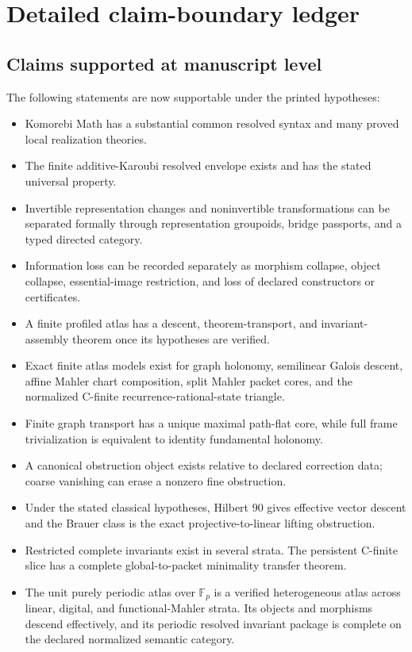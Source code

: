 \section{Detailed claim-boundary ledger}
\label{app:block14-claim-ledger}

\subsection{Claims supported at manuscript level}

The following statements are now supportable under the printed hypotheses:

\begin{itemize}
\item Komorebi Math has a substantial common resolved syntax and many proved local realization theories.
\item The finite additive-Karoubi resolved envelope exists and has the stated universal property.
\item Invertible representation changes and noninvertible transformations can be separated formally through representation groupoids, bridge passports, and a typed directed category.
\item Information loss can be recorded separately as morphism collapse, object collapse, essential-image restriction, and loss of declared constructors or certificates.
\item A finite profiled atlas has a descent, theorem-transport, and invariant-assembly theorem once its hypotheses are verified.
\item Exact finite atlas models exist for graph holonomy, semilinear Galois descent, affine Mahler chart composition, split Mahler packet cores, and the normalized C-finite recurrence-rational-state triangle.
\item Finite graph transport has a unique maximal path-flat core, while full frame trivialization is equivalent to identity fundamental holonomy.
\item A canonical obstruction object exists relative to declared correction data; coarse vanishing can erase a nonzero fine obstruction.
\item Under the stated classical hypotheses, Hilbert 90 gives effective vector descent and the Brauer class is the exact projective-to-linear lifting obstruction.
\item Restricted complete invariants exist in several strata. The persistent C-finite slice has a complete global-to-packet minimality transfer theorem.
\item The unit purely periodic atlas over \(\mathbb F_p\) is a verified heterogeneous atlas across linear, digital, and functional-Mahler strata. Its objects and morphisms descend effectively, and its periodic resolved invariant package is complete on the declared normalized semantic category.

\end{itemize}
